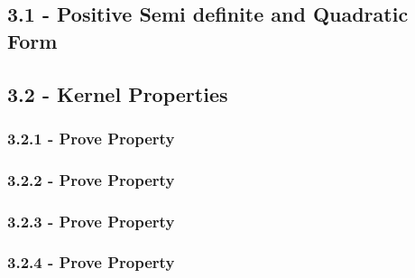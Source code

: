\documentclass[10pt]{article}
\begin{document}
\subsection{3.1 - Positive Semi definite and Quadratic Form}
\subsection{3.2 - Kernel Properties}
\subsubsection{3.2.1 - Prove Property}
\subsubsection{3.2.2 - Prove Property}
\subsubsection{3.2.3 - Prove Property}
\subsubsection{3.2.4 - Prove Property}



\pagebreak
\end{document}
